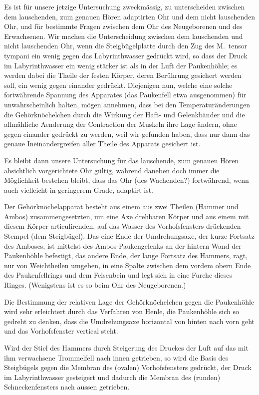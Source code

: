 \documentclass[12pt,a4paper]{article}
\begin{document}
\newpage
Es ist f\"ur unsere jetzige Untersuchung zweckm\"assig, zu unterscheiden zwischen dem lauschenden, zum genauen H\"oren adaptirten Ohr und dem nicht lauschenden Ohr, und f\"ur bestimmte Fragen zwischen dem Ohr des Neugeborenen und des Erwachsenen. Wir machen die Unterscheidung zwischen dem lauschenden und nicht lauschenden Ohr, wenn die Steigb\"ugelplatte durch den Zug des M.~tensor tympani ein wenig gegen das Labyrinthwasser gedr\"uckt wird, so dass der Druck im Labyrinthwasser ein wenig st\"arker ist als in der Luft der Paukenh\"ohle; es werden dabei die Theile der festen K\"orper, deren Ber\"uhrung gesichert werden soll, ein wenig gegen einander gedr\"uckt. Diejenigen nun, welche eine solche fortw\"ahrende Spannung des Apparates (das Paukenfell etwa ausgenommen) f\"ur unwahrscheinlich halten, m\"ogen annehmen, dass bei den Temperatur\"anderungen die Geh\"orkn\"ochelchen durch die Wirkung der Haft- und Gelenkb\"ander und die allm\"ahliche Aenderung der Contraction der Muskeln ihre Lage \"andern, ohne gegen einander gedr\"uckt zu werden, weil wir gefunden haben, dass nur dann das genaue Ineinandergreifen aller Theile des Apparats gesichert ist.

Es bleibt dann unsere Untersuchung f\"ur das lauschende, zum genauen H\"oren absichtlich vorgerichtete Ohr g\"ultig, w\"ahrend daneben doch immer die M\"oglichkeit bestehen bleibt, dass das Ohr (des Wachenden?) fortw\"ahrend, wenn auch vielleicht in geringerem Grade, adaptirt ist.

Der Geh\"orkn\"ochelapparat besteht aus einem aus zwei Theilen (Hammer und Ambos) zusammengesetzten, um eine Axe drehbaren K\"orper und aus einem mit diesem K\"orper articulirenden, auf das Wasser des Vorhofsfensters dr\"uckenden Stempel (dem Steigb\"ugel). Das eine Ende der Umdrehungsaxe, der kurze Fortsatz des Amboses, ist mittelst des Ambos-Paukengelenks an der hintern Wand der Paukenh\"ohle befestigt, das andere Ende, der lange Fortsatz des Hammers, ragt, nur von Weichtheilen umgeben, in eine Spalte zwischen dem vordem obern Ende des Paukenfellrings und dem Felsenbein und legt sich in eine Furche dieses Ringes. (Wenigstens ist es so beim Ohr des Neugeborenen.)

Die Bestimmung der relativen Lage der Geh\"orkn\"ochelchen gegen die Paukenh\"ohle wird sehr erleichtert durch das Verfahren von Henle, die Paukenh\"ohle sich so gedreht zu denken, dass die Umdrehungsaxe horizontal von hinten nach vorn geht und das Vorhofsfenster vertical steht.

Wird der Stiel des Hammers durch Steigerung des Druckes der Luft auf das mit ihm verwachsene Trommelfell nach innen getrieben, so wird die Basis des Steigb\"ugels gegen die Membran des (ovalen) Vorhofsfensters gedr\"uckt, der Druck im Labyrinthwasser gesteigert und dadurch die Membran des (runden) Schneckenfensters nach aussen getrieben.
\end{document}
